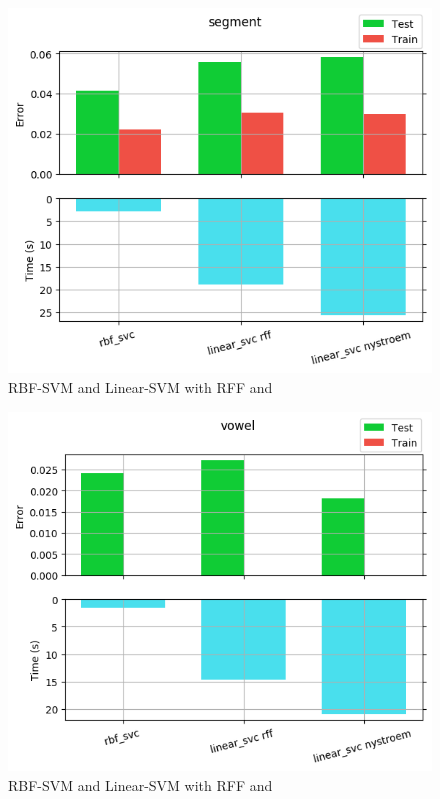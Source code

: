 \begin{figure}[th]
\centering
\includegraphics[scale=\imgscale]{Figures/1_1/segment}
\decoRule
\caption[1.1 segment]{RBF-SVM and Linear-SVM with RFF and \Nys}
\label{fig:1_1_segment}
\end{figure}

\begin{figure}[th]
\centering
\includegraphics[scale=\imgscale]{Figures/1_1/vowel}
\decoRule
\caption[1.1 vowel]{RBF-SVM and Linear-SVM with RFF and \Nys}
\label{fig:vowel}
\end{figure}
